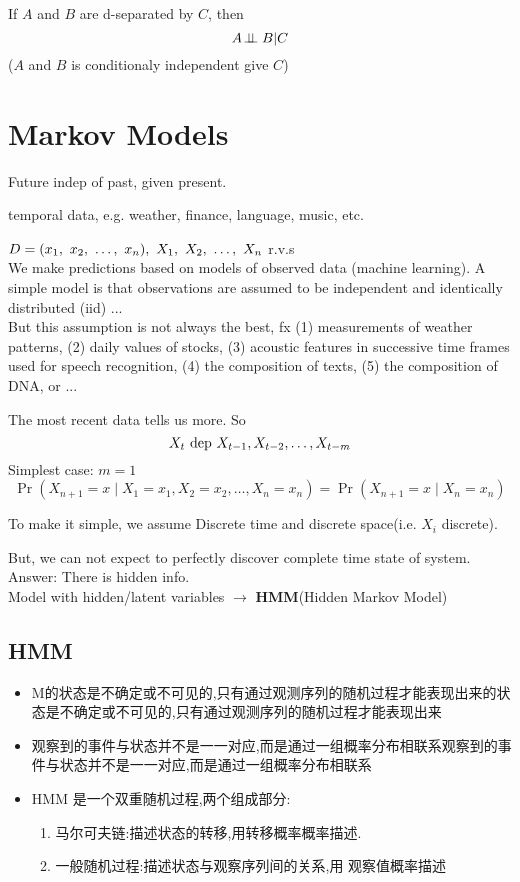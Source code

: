 \documentclass{article}
\begin{document}
\begin{theorem}
If $A$ and $B$ are d-separated by $C$, then 
$$A \!\perp\!\!\!\perp B | C$$
($A$ and $B$ is conditionaly independent give $C$)
\end{theorem}

\section{Markov Models}
Future indep of past, given present.

temporal data, e.g. weather, finance, language, music, etc.

$D = (x_1,~x_2,~\ldots,~x_n),\ X_1,~X_2,~\ldots,~X_n$ r.v.s \\
We make predictions based on models of observed data (machine learning). 
A simple model is that observations are assumed to be independent and identically distributed (iid) ...\\
But this assumption is not always the best, fx 
(1) measurements of weather patterns, 
(2) daily values of stocks, 
(3) acoustic features in successive time frames used for speech recognition, 
(4) the composition of texts, (5) the composition of DNA, or ...

The most recent data tells us more. So
$$X_t \text{ dep } X_{t-1}, X_{t-2}, \ldots, X_{t-m}$$
Simplest case: $m = 1$
$$
\Pr(X_{n+1}=x\mid X_1=x_1, X_2=x_2, \ldots, X_n=x_n) = \Pr(X_{n+1}=x\mid X_n=x_n)
$$

To make it simple, we assume Discrete time and discrete space(i.e. $X_i$ discrete).

\noindent
But, we can not expect to perfectly discover complete time state of system.\\
Answer: There is hidden info.\\
Model with hidden/latent variables $\rightarrow$ \textbf{HMM}(Hidden Markov Model)

\subsection{HMM}
\begin{itemize}
\item M的状态是不确定或不可见的,只有通过观测序列的随机过程才能表现出来的状态是不确定或不可见的,只有通过观测序列的随机过程才能表现出来
\item 观察到的事件与状态并不是一一对应,而是通过一组概率分布相联系观察到的事件与状态并不是一一对应,而是通过一组概率分布相联系
\item HMM 是一个双重随机过程,两个组成部分:
	\begin{enumerate}
	\item 马尔可夫链:描述状态的转移,用转移概率概率描述.
	\item 一般随机过程:描述状态与观察序列间的关系,用 观察值概率描述
	\end{enumerate}
\end{itemize}
\end{document}
